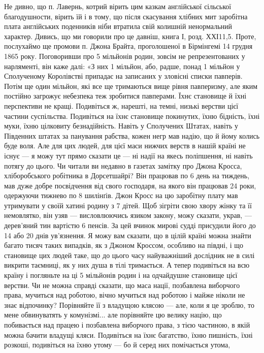 Не дивно, що п. Лавернь, котрий вірить цим казкам англійської сільської
благодушности, вірить їй і в тому, що після скасування хлібних мит заробітна плата
англійських поденників ніби втратила свій колишній ненормальний характер.
Дивись, що ми говорили про це давніш, книга І, розд. ХХІ11,5. Проте, послухаймо
ще промови п. Джона Брайта, проголошеної в Бірмінгемі 14 грудня 1865 року.
Поговоривши про 5 мільйонів родин, зовсім не репрезентованих у нарляменті,
він каже далі: «З них 1 мільйон, або, радше, понад 1 мільйон у Сполученому
Королівстві припадає на записаних у зловісні списки павперів. Потім ще один
мільйон, які все ще тримаються вище рівня павперизму, але яким постійно
загрожує небезпека теж зробитися павперами. Їхнє становище й їхні перспективи
не кращі. Подивіться ж, нарешті, на темні, низькі верстви цієї частини суспільства.
Подивіться на їхнє становище покинутих, їхню бідність, їхні муки, їхню цілковиту
безнадійність. Навіть у Сполучених Штатах, навіть у Південних штатах за
панування рабства, кожен негр мав надію, що й йому колись буде воля.
Але для цих людей, для цієї маси нижчих верств в нашій країні не існує —
я можу тут прямо сказати це — ні надії на якесь поліпшення, ні навіть
потягу до цього. Чи читали ви недавно в газетах замітку про Джона Кросса,
хліборобського робітника в Дорсетшайрі? Він працював по 6 день на тиждень,
мав дуже добре посвідчення від свого господаря, на якого він працював 24 роки,
одержуючи тижнево по 8 шилінґів. Джон Кросс на цю заробітну плату мав
утримувати у своїй хатині родину з 7 дітей. Щоб зігріти свою хвору жінку та
її немовлятко, він узяв — висловлюючись язиком закону, можу сказати, украв, —
дерев’яний тин вартістю 6 пенсів. За цей вчинок мирові судді присудили його
до 14 або 20 днів ув’язнення. Я можу вам сказати, що в цілій країні можна
знайти багато тисяч таких випадків, як з Джоном Кроссом, особливо на півдні,
і що становище цих людей таке, що до цього часу найуважніший дослідник не
в силі викрити таємниці, як у них душа в тілі тримається. А тепер подивіться
на всю країну і погляньте на ці 5 мільйонів родин і на одчайдушне становище
цієї верстви. Чи не можна справді сказати, що маса нації, позбавлена
виборчого права, мучиться над роботою, вічно мучиться над роботою і майже
ніколи не знає відпочинку? Порівняйте її з владущою клясою — але, коли я це
зроблю, то мене обвинуватять у комунізмі... але порівняйте цю велику націю,
що побивається над працею і позбавлена виборчого права, з тією частиною,
в якій можна бачити владущі кляси. Подивіться на їхнє багатство, їхню пишність,
їхні розкоші, подивіться на їхню утому — бо й серед них помічається утома,
\parbreak{}  %
